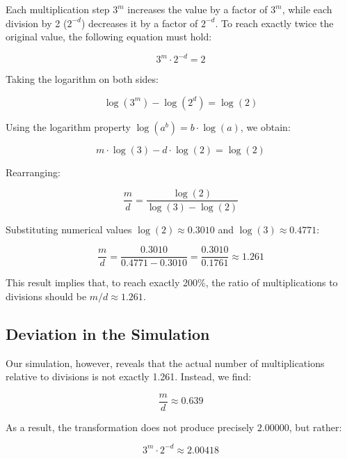 \documentclass[a4paper,12pt]{article}
\begin{document}
Each multiplication step \( 3^m \) increases the value by a factor of \( 3^m \), while each division by 2 (\( 2^{-d} \)) decreases it by a factor of \( 2^{-d} \). To reach exactly twice the original value, the following equation must hold:  

\begin{equation}
    3^m \cdot 2^{-d} = 2
\end{equation}

Taking the logarithm on both sides:

\begin{equation}
    \log(3^m) - \log(2^d) = \log(2)
\end{equation}

Using the logarithm property \( \log(a^b) = b \cdot \log(a) \), we obtain:

\begin{equation}
    m \cdot \log(3) - d \cdot \log(2) = \log(2)
\end{equation}

Rearranging:

\begin{equation}
    \frac{m}{d} = \frac{\log(2)}{\log(3) - \log(2)}
\end{equation}

Substituting numerical values \( \log(2) \approx 0.3010 \) and \( \log(3) \approx 0.4771 \):

\begin{equation}
    \frac{m}{d} = \frac{0.3010}{0.4771 - 0.3010} = \frac{0.3010}{0.1761} \approx 1.261
\end{equation}

This result implies that, to reach exactly 200\%, the ratio of multiplications to divisions should be \( m/d \approx 1.261 \).  

\subsection{Deviation in the Simulation}  

Our simulation, however, reveals that the actual number of multiplications relative to divisions is not exactly 1.261. Instead, we find:

\begin{equation}
    \frac{m}{d} \approx 0.639
\end{equation}

As a result, the transformation does not produce precisely \( 2.00000 \), but rather:

\begin{equation}
    3^m \cdot 2^{-d} \approx 2.00418
\end{equation}
\end{document}
